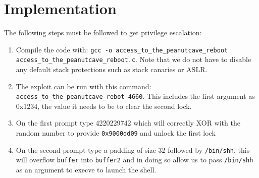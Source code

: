 \section{Implementation}
\label{sec:implementation}
The following steps must be followed to get privilege escalation:
\begin{enumerate}
\item Compile the code with:  {\tt gcc -o access\_to\_the\_peanutcave\_reboot access\_to\_the\_peanutcave\_reboot.c}. Note that we do not have to disable any default stack protections such as stack canaries or ASLR. 
\item The exploit can be run with this command: {\tt access\_to\_the\_peanutcave\_rebot 4660}. This includes the first argument as 0x1234, the value it needs to be to clear the second lock.
\item On the first prompt type 4220229742 which will correctly XOR with the random number to provide {\tt0x9000dd09} and unlock the first lock
\item On the second prompt type a padding of size 32 followed by {\tt /bin/shh}, this will overflow {\tt buffer} into {\tt buffer2} and in doing so allow us to pass {\tt /bin/shh} as an argument to execve to launch the shell.
\end{enumerate}


